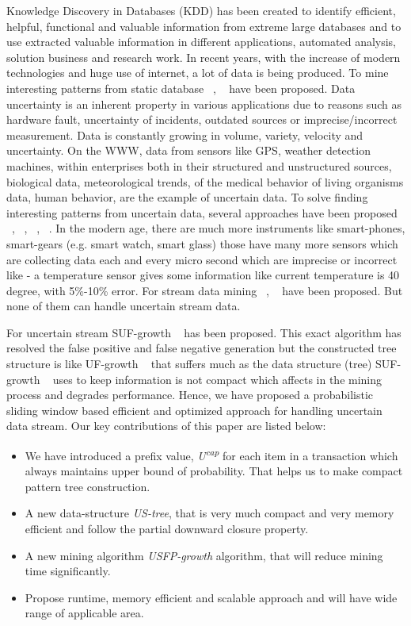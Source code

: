 \documentclass[conference]{IEEEtran}
\begin{document}
Knowledge Discovery in Databases (KDD) has been created to identify efficient, helpful, functional and valuable information from extreme large databases and to use extracted valuable information in different applications, automated analysis, solution business and research work. In recent years, with the increase of modern technologies and huge use of internet, a lot of data is being produced. To mine interesting patterns from static database ~\cite{DBLP:conf/vldb/AgrawalS94}, ~\cite{DBLP:journals/datamine/HanPYM04} have been proposed.
Data uncertainty is an inherent property in various applications due to reasons such as hardware fault, uncertainty of incidents, outdated sources or imprecise/incorrect measurement. Data is constantly growing in volume, variety, velocity and uncertainty. On the WWW, data from sensors like GPS, weather detection machines, within enterprises both in their structured and unstructured sources, biological data, meteorological trends, of the medical behavior of living organisms data, human behavior, are the example of uncertain data. To solve finding interesting patterns from uncertain data, several approaches have been proposed ~\cite{DBLP:journals/tkde/ZhaoYN14}, ~\cite{DBLP:conf/kdd/AggarwalLWW09}, ~\cite{DBLP:conf/pakdd/LeungT13}, ~\cite{DBLP:conf/dasfaa/LeungT12}.
In the modern age, there are much more instruments like smart-phones, smart-gears (e.g. smart watch, smart glass) those have many more sensors which are collecting data each and every micro second which are imprecise or incorrect like - a temperature sensor gives some information like current temperature is 40 degree, with 5\%-10\% error. For stream data mining ~\cite{DBLP:conf/icdm/LeungK06}, ~\cite{DBLP:journals/vldb/CormodeH10} have been proposed. But none of them can handle uncertain stream data.

For uncertain stream SUF-growth ~\cite{DBLP:conf/icde/LeungH09} has been proposed. This exact algorithm has resolved the false positive and false negative generation but the constructed tree structure is like UF-growth ~\cite{DBLP:conf/kdd/GadeWK04} that suffers much as the data structure (tree) SUF-growth ~\cite{DBLP:conf/icde/LeungH09} uses to keep information is not compact which affects in the mining process and degrades performance. Hence, we have proposed a probabilistic sliding window based efficient and optimized approach for handling uncertain data stream.
Our key contributions of this paper are listed below:
\begin{itemize}
  \item We have introduced a prefix value, \emph{U\textsuperscript{cap}} for each item in a transaction which always maintains upper bound of probability. That helps us to make compact pattern tree construction.
  \item A new data-structure \emph{US-tree}, that is very much compact and very memory efficient and follow the partial downward closure property.
  \item A new mining algorithm \emph{USFP-growth} algorithm, that will reduce mining time significantly.
  \item Propose runtime, memory efficient and scalable approach and will have wide range of applicable area.
  \end{itemize}
  
\end{document}
